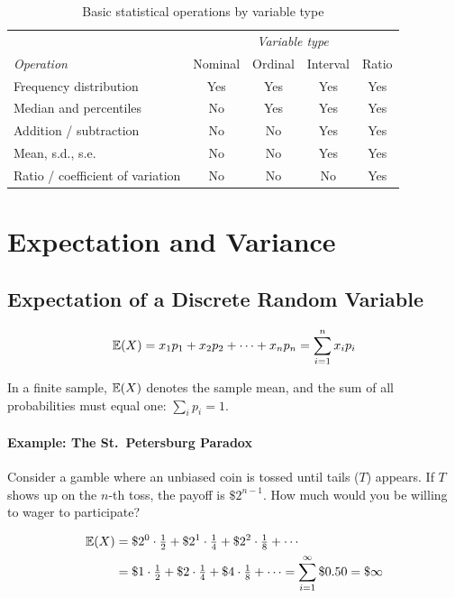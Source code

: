 \begin{table}[htp]
\centering
\caption{Basic statistical operations by variable type}
\label{tbl_Vars}
\renewcommand{\arraystretch}{1.3}
\begin{tabular}{@{}lcccc@{}}
\toprule
& \multicolumn{4}{c}{\emph{Variable type}} \\
\cmidrule{2-5}
\emph{Operation} & Nominal & Ordinal & Interval & Ratio \\
\midrule
Frequency distribution    & Yes & Yes & Yes & Yes \\
Median and percentiles    & No  & Yes & Yes & Yes \\
Addition / subtraction    & No  & No  & Yes & Yes \\
Mean, s.d., s.e.          & No  & No  & Yes & Yes \\
Ratio / coefficient of variation & No & No & No & Yes \\
\bottomrule
\end{tabular}
\renewcommand{\arraystretch}{1}
\end{table}


\section{Expectation and Variance}
\label{sec_Expectation}

\subsection{Expectation of a Discrete Random Variable}

\begin{equation}
  \mathbb{E}(X) = x_1 p_1 + x_2 p_2 + \cdots + x_n p_n = \sum_{i=1}^{n} x_i p_i
\end{equation}

In a finite sample, $\mathbb{E}(X)$ denotes the sample mean, and the sum of all
probabilities must equal one: $\sum_i p_i = 1$.

\paragraph{Example: The St.\ Petersburg Paradox}

Consider a gamble where an unbiased coin is tossed until tails ($T$) appears.
If $T$ shows up on the $n$-th toss, the payoff is $\$2^{n-1}$. How much would
you be willing to wager to participate?

\begin{align*}
  \mathbb{E}(X) &= \$2^0 \cdot \tfrac{1}{2} + \$2^1 \cdot \tfrac{1}{4}
           + \$2^2 \cdot \tfrac{1}{8} + \cdots \\
        &= \$1\cdot\tfrac{1}{2} + \$2\cdot\tfrac{1}{4}
           + \$4\cdot\tfrac{1}{8} + \cdots
         = \sum_{i=1}^{\infty} \$0.50 = \$\infty
\end{align*}

